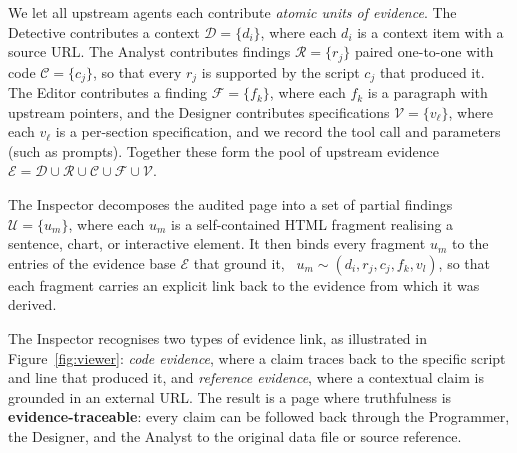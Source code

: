 We let all upstream agents each contribute \textit{atomic units of evidence}. 
The Detective contributes a context ${\mathcal{D}} = \{d_i\}$, where each $d_i$ is a context item with a source URL. The Analyst contributes findings $\mathcal{R} = \{r_j\}$ paired one-to-one with code $\mathcal{C} = \{c_j\}$, so that every $r_j$ is supported by the script $c_j$ that produced it. The Editor contributes a finding $\mathcal{F} = \{f_k\}$, where each $f_k$ is a paragraph with upstream pointers, and the Designer contributes specifications $\mathcal{V} = \{v_\ell\}$, where each $v_\ell$ is a per-section specification, and we record the tool call and parameters (such as prompts).
Together these form the pool of upstream evidence $\mathcal{E} = {\mathcal{D}} \cup \mathcal{R} \cup \mathcal{C} \cup \mathcal{F} \cup \mathcal{V}$.

The Inspector decomposes the audited page into a set of partial findings $\mathcal{U} = \{u_m\}$, where each $u_m$ is a self-contained HTML fragment realising a sentence, chart, or interactive element. It then binds every fragment $u_m$ to the entries of the evidence base $\mathcal{E}$ that ground it, \ie~$u_m \sim (d_i, r_j, c_j, f_k, v_l)$, so that each fragment carries an explicit link back to the evidence from which it was derived. 

The Inspector recognises two types of evidence link, as illustrated in Figure~\ref{fig:viewer}: \textit{code evidence}, where a claim traces back to the specific script and line that produced it, and \textit{reference evidence}, where a contextual claim is grounded in an external URL. 
The result is a page where truthfulness is \textbf{evidence-traceable}: every claim can be followed back through the Programmer, the Designer, and the Analyst to the original data file or source reference.